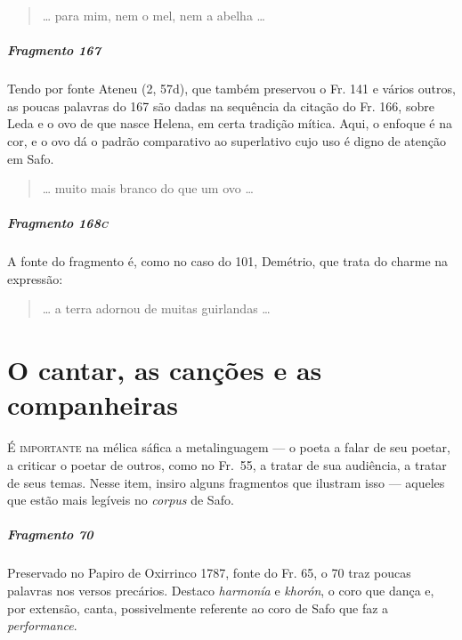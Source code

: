 {\begin{verse}
\ldots{} para mim, nem o mel, nem a abelha \ldots{}
\end{verse}

\paragraph{Fragmento 167}

{\small Tendo por fonte Ateneu (2, 57d), que também preservou o Fr. 141 e vários outros, as poucas palavras do 167 são dadas na sequência da citação do Fr. 166, sobre Leda e o ovo de que nasce Helena, em certa tradição mítica. Aqui, o enfoque é na cor, e o ovo dá o padrão comparativo ao superlativo cujo uso é digno de atenção em Safo.}

\begin{verse}
\ldots{} muito mais branco do que um ovo \ldots{}
\end{verse}


\paragraph{Fragmento 168\textsc{c}}

{\small A fonte do fragmento é, como no caso do 101, Demétrio, que trata do charme na
expressão:}

\begin{verse}
\ldots{} a terra adornou de muitas guirlandas \ldots{}
\end{verse}


\chapter[O cantar, as canções e as companheiras]{O cantar, as canções e as companheiras}


\textsc{É importante} na mélica sáfica a metalinguagem --- o poeta a falar de seu
poetar, a criticar o poetar de outros, como no Fr.~55, a tratar de sua
audiência, a tratar de seus temas. Nesse item, insiro alguns fragmentos que
ilustram isso --- aqueles que estão mais legíveis no \textit{corpus} de Safo.


\paragraph{Fragmento 70}

{\small Preservado no Papiro de Oxirrinco 1787, fonte do Fr. 65, o 70 traz poucas palavras nos versos precários. Destaco \textit{harmonía} e \textit{khorón}, o coro que dança e, por extensão, canta, possivelmente referente ao coro de Safo que faz a \textit{performance}.}

}
